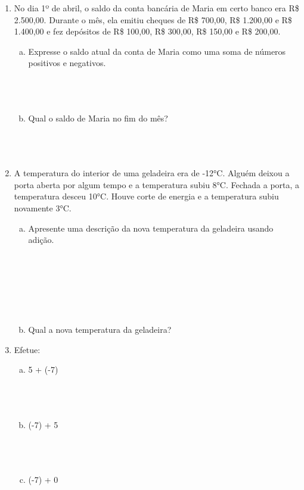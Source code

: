 \documentclass[a4paper,14pt]{article}
\begin{document}
\begin{multicols}{2}
\begin{enumerate}
\begin{enumerate}[a)]
    		\end{enumerate}
    		\item No dia 1º de abril, o saldo da conta bancária de Maria em certo banco era R\$ 2.500,00. Durante o mês, ela emitiu cheques de R\$ 700,00, R\$ 1.200,00 e R\$ 1.400,00 e fez depósitos de R\$ 100,00, R\$ 300,00, R\$ 150,00 e R\$ 200,00.
    		\begin{enumerate}[a)]
    			\item Expresse o saldo atual da conta de Maria como uma soma de números positivos e negativos. \\\\\\\\
    			\item Qual o saldo de Maria no fim do mês? \\\\\\\\
    		\end{enumerate}
    		\item A temperatura do interior de uma geladeira era de -12°C. Alguém deixou a porta aberta por algum tempo e a temperatura subiu 8°C. Fechada a porta, a temperatura desceu 10°C. Houve corte de energia e a temperatura subiu novamente 3°C.
    		\begin{enumerate}[a)]
    			\item Apresente uma descrição da nova temperatura da geladeira usando adição. \\\\\\\\\\\\\\
    			\item Qual a nova temperatura da geladeira? \newpage
    		\end{enumerate}
    		\item Efetue:
    		\begin{enumerate}[a)]
    			\item 5 + (-7) \\\\\\\\
    			\item (-7) + 5 \\\\\\\\
    			\item (-7) + 0 \\\\\\\\

\end{enumerate}
\end{enumerate}
\end{multicols}
\end{document}
